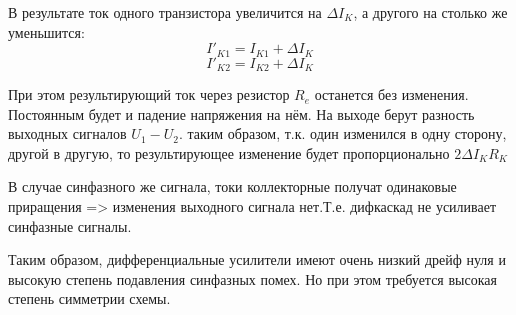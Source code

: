 В результате ток одного транзистора увеличится на $\Delta I_K$, а другого на столько же уменьшится:
$$
I'_{K1} = I_{K1} + \Delta I_K
$$ 
$$
I'_{K2} = I_{K2} + \Delta I_K
$$ 

При этом результирующий ток через резистор $R_e$ останется без изменения. Постоянным будет и падение напряжения на нём. На выходе берут разность выходных сигналов $U_1 - U_2$. таким образом, т.к. один изменился в одну сторону, другой в другую, то результирующее изменение будет пропорционально $2\Delta I_K R_K$

В случае синфазного же сигнала, токи коллекторные получат одинаковые приращения => изменения выходного сигнала нет.Т.е. дифкаскад не усиливает синфазные сигналы.

Таким образом, дифференциальные усилители имеют очень низкий дрейф нуля и высокую степень подавления синфазных помех. Но при этом требуется высокая степень симметрии схемы.
